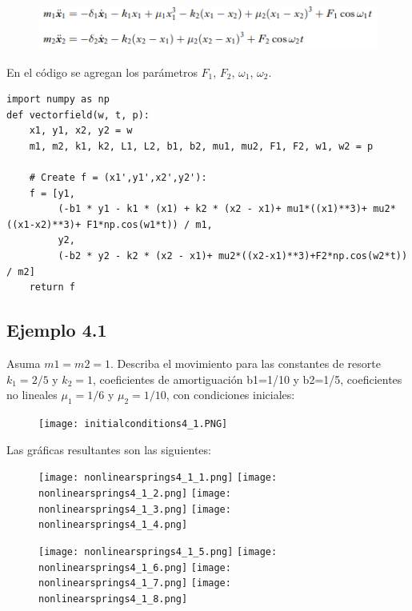 \documentclass[a4paper]{article}
\begin{document}
\begin{figure}[ht!]
\centering
\includegraphics[width=0.7 \linewidth]{forcing_eq.PNG}
\end{figure}

\newpage
En el código se agregan los parámetros $F_1$, $F_2$, $\omega_1$, $\omega_2$.

\begin{verbatim}
import numpy as np
def vectorfield(w, t, p):
    x1, y1, x2, y2 = w
    m1, m2, k1, k2, L1, L2, b1, b2, mu1, mu2, F1, F2, w1, w2 = p

    # Create f = (x1',y1',x2',y2'):
    f = [y1,
         (-b1 * y1 - k1 * (x1) + k2 * (x2 - x1)+ mu1*((x1)**3)+ mu2*((x1-x2)**3)+ F1*np.cos(w1*t)) / m1,
         y2,
         (-b2 * y2 - k2 * (x2 - x1)+ mu2*((x2-x1)**3)+F2*np.cos(w2*t)) / m2]
    return f
\end{verbatim}



\subsection{Ejemplo 4.1}
Asuma $m1=m2=1$. Describa el movimiento para las constantes de resorte $k_1=2/5$ y $k_2=1$, coeficientes de amortiguación b1=1/10 y b2=1/5, coeficientes no lineales $\mu_1=1/6$ y $\mu_2=1/10$, con condiciones iniciales:


\begin{figure}[ht!]
\centering
\texttt{[image: initialconditions4\_1.PNG]}
\end{figure}


Las gráficas resultantes son las siguientes:

\begin{figure}[ht!]
\centering
\texttt{[image: nonlinearsprings4\_1\_1.png]}
\texttt{[image: nonlinearsprings4\_1\_2.png]}
\texttt{[image: nonlinearsprings4\_1\_3.png]}
\texttt{[image: nonlinearsprings4\_1\_4.png]}

\end{figure}
\newpage
\begin{figure}[ht!]
\centering
\texttt{[image: nonlinearsprings4\_1\_5.png]}
\texttt{[image: nonlinearsprings4\_1\_6.png]}
\texttt{[image: nonlinearsprings4\_1\_7.png]}
\texttt{[image: nonlinearsprings4\_1\_8.png]}
\end{figure}
\end{document}
